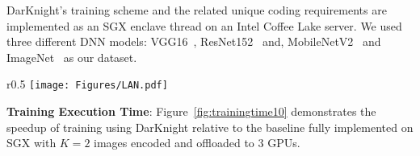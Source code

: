 DarKnight's training scheme and the related unique coding requirements are implemented as an SGX enclave thread on an Intel Coffee Lake server. %
We used three different DNN models: VGG16~\citep{simonyan2014very}, ResNet152~\citep{he2016deep} and, MobileNetV2~\citep{sandler2018mobilenetv2} and %
ImageNet~\citep{russakovsky2015imagenet} as our dataset.%
\begin{wrapfigure}{r}{0.5\textwidth}
    \texttt{[image: Figures/LAN.pdf]}
    \caption{Training Speedup over Baseline}
    \label{fig:trainingtime10}
\end{wrapfigure}
\textbf{Training Execution Time}: Figure~\ref{fig:trainingtime10} demonstrates the speedup of training using DarKnight relative to the baseline fully implemented on SGX with $K=2$ images encoded and offloaded to $3$ GPUs. %
